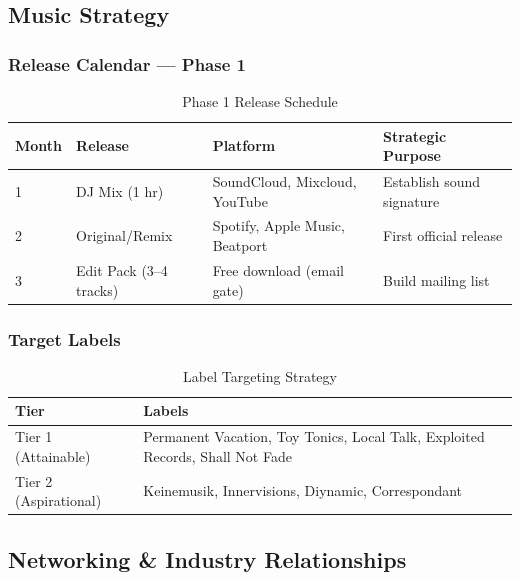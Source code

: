 \documentclass[11pt,a4paper]{article}
\begin{document}
\subsection{Music Strategy}

\subsubsection{Release Calendar --- Phase 1}

\begin{table}[h!]
\centering
\renewcommand{\arraystretch}{1.3}
\begin{tabularx}{\textwidth}{l l l X}
\toprule
\rowcolor{amaraprimary}
\textcolor{amaracream}{\textbf{Month}} & \textcolor{amaracream}{\textbf{Release}} & \textcolor{amaracream}{\textbf{Platform}} & \textcolor{amaracream}{\textbf{Strategic Purpose}} \\
\midrule
1 & DJ Mix (1 hr) & SoundCloud, Mixcloud, YouTube & Establish sound signature \\
2 & Original/Remix & Spotify, Apple Music, Beatport & First official release \\
3 & Edit Pack (3--4 tracks) & Free download (email gate) & Build mailing list \\
\bottomrule
\end{tabularx}
\caption{Phase 1 Release Schedule}
\end{table}

\subsubsection{Target Labels}

\begin{table}[h!]
\centering
\renewcommand{\arraystretch}{1.3}
\begin{tabularx}{\textwidth}{l X}
\toprule
\rowcolor{amaraprimary}
\textcolor{amaracream}{\textbf{Tier}} & \textcolor{amaracream}{\textbf{Labels}} \\
\midrule
Tier 1 (Attainable) & Permanent Vacation, Toy Tonics, Local Talk, Exploited Records, Shall Not Fade \\
\midrule
Tier 2 (Aspirational) & Keinemusik, Innervisions, Diynamic, Correspondant \\
\bottomrule
\end{tabularx}
\caption{Label Targeting Strategy}
\end{table}

\subsection{Networking \& Industry Relationships}
\end{document}
